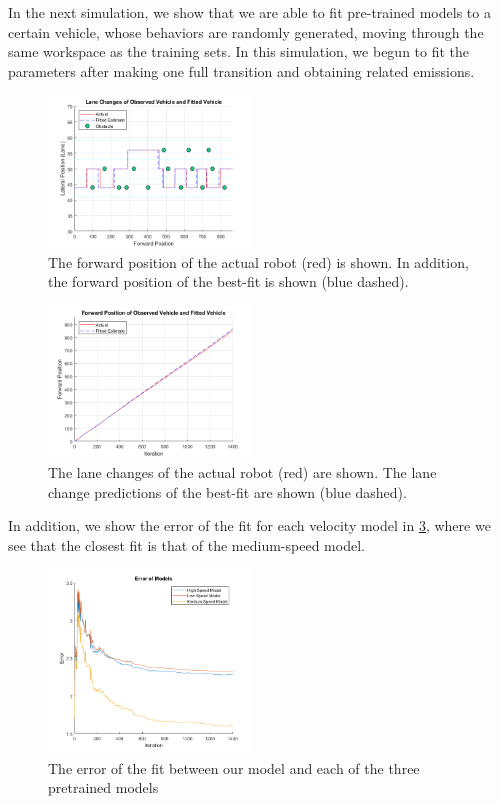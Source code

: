 \documentclass[letterpaper, 10 pt, conference]{ieeeconf}  %
\begin{document}
In the next simulation, we show that we are able to fit pre-trained models to a certain vehicle, whose behaviors are randomly generated, moving through the same workspace as the training sets. In this simulation, we begun to fit the parameters after making one full transition and obtaining related emissions. 

\begin{figure}[ht]
    \includegraphics[width=0.48\textwidth]{fit2.png}
    \caption{The forward position of the actual robot (red) is shown. In addition, the forward position of the best-fit is shown (blue dashed).}
    \label{fig:fwd}
\end{figure}

\begin{figure}[ht]
    \includegraphics[width=0.48\textwidth]{fit1.png}
    \caption{The lane changes of the actual robot (red) are shown. The lane change predictions of the best-fit are shown (blue dashed).}
    \label{fig:lanchan}
\end{figure}
 In addition, we show the error of the fit for each velocity model in \ref{fig:error}, where we see that the closest fit is that of the medium-speed model.
 
 \begin{figure}[ht]
    \includegraphics[width=0.48\textwidth]{fit3.png}
    \caption{The error of the fit between our model and each of the three pretrained models}
    \label{fig:error}
\end{figure}
 
\end{document}
